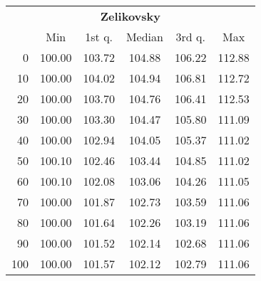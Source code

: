 \begin{tabular}{r|ccccc}
  \multicolumn{6}{c}{{\bf Zelikovsky}} \\
  & Min & 1st q. & Median & 3rd q. & Max \\ \hline\hline
  0 & 100.00 & 103.72 & 104.88 & 106.22 & 112.88
\\ 10 & 100.00 & 104.02 & 104.94 & 106.81 & 112.72
\\ 20 & 100.00 & 103.70 & 104.76 & 106.41 & 112.53
\\ 30 & 100.00 & 103.30 & 104.47 & 105.80 & 111.09
\\ 40 & 100.00 & 102.94 & 104.05 & 105.37 & 111.02
\\ 50 & 100.10 & 102.46 & 103.44 & 104.85 & 111.02
\\ 60 & 100.10 & 102.08 & 103.06 & 104.26 & 111.05
\\ 70 & 100.00 & 101.87 & 102.73 & 103.59 & 111.06
\\ 80 & 100.00 & 101.64 & 102.26 & 103.19 & 111.06
\\ 90 & 100.00 & 101.52 & 102.14 & 102.68 & 111.06
\\ 100 & 100.00 & 101.57 & 102.12 & 102.79 & 111.06
\end{tabular}
